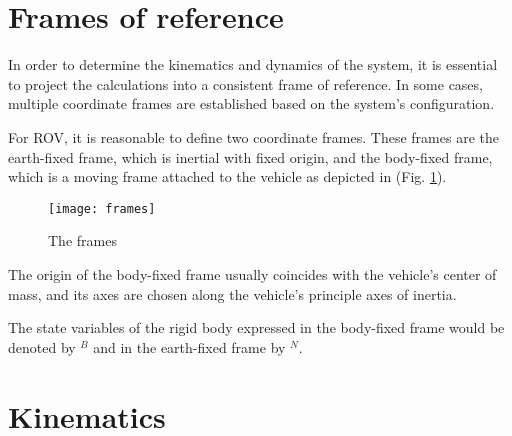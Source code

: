 \section{Frames of reference}

    In order to determine the kinematics and dynamics of the system, it is essential 
    to project the calculations into a consistent frame of reference. 
    In some cases, multiple coordinate frames are established based on the system's configuration.
    
    For ROV, it is reasonable to define two coordinate frames. 
    These frames are the earth-fixed frame, which is inertial with fixed origin, and the body-fixed frame, 
    which is a moving frame attached to the vehicle as depicted in (Fig. \ref{image:frames}). 
    \begin{figure}[H]
        \centering\texttt{[image: frames]}
        \caption{The frames}
        \label{image:frames}
    \end{figure}

    The origin of the body-fixed frame usually coincides with the vehicle's center of mass,
     and its axes are chosen along the vehicle's principle axes of inertia.

    The state variables of the rigid body expressed in the body-fixed frame would be 
    denoted by $^B$ and in the earth-fixed frame by $^N$.

\section{Kinematics}

